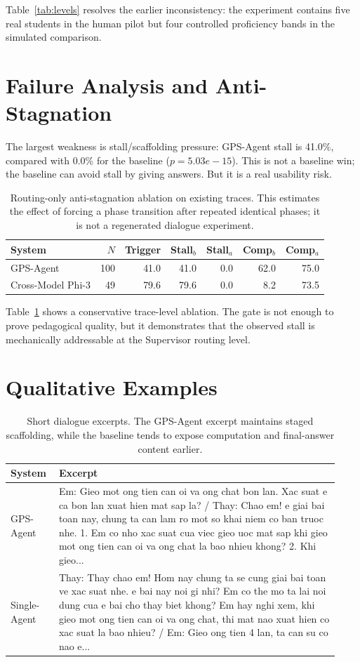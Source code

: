 \documentclass[11pt]{article}
\begin{document}
Table~\ref{tab:levels} resolves the earlier inconsistency: the experiment contains five real students in the human pilot but four controlled proficiency bands in the simulated comparison.

\section{Failure Analysis and Anti-Stagnation}
The largest weakness is stall/scaffolding pressure: GPS-Agent stall is 41.0\%, compared with 0.0\% for the baseline ($p=5.03e-15$). This is not a baseline win; the baseline can avoid stall by giving answers. But it is a real usability risk.

\begin{table}[t]
\centering
\small
\begin{tabular}{lrrrrrr}
\toprule
System & $N$ & Trigger & Stall$_b$ & Stall$_a$ & Comp$_b$ & Comp$_a$ \\
\midrule
GPS-Agent & 100 & 41.0 & 41.0 & 0.0 & 62.0 & 75.0 \\
Cross-Model Phi-3 & 49 & 79.6 & 79.6 & 0.0 & 8.2 & 73.5 \\
\bottomrule
\end{tabular}
\caption{Routing-only anti-stagnation ablation on existing traces. This estimates the effect of forcing a phase transition after repeated identical phases; it is not a regenerated dialogue experiment.}
\label{tab:ablation}
\end{table}

Table~\ref{tab:ablation} shows a conservative trace-level ablation. The gate is not enough to prove pedagogical quality, but it demonstrates that the observed stall is mechanically addressable at the Supervisor routing level.

\section{Qualitative Examples}
\begin{table}[t]
\centering
\small
\begin{tabular}{p{0.13\linewidth}p{0.80\linewidth}}
\toprule
System & Excerpt \\
\midrule
GPS-Agent & Em: Gieo mot ong tien can oi va ong chat bon lan. Xac suat e ca bon lan xuat hien mat sap la? / Thay: Chao em! e giai bai toan nay, chung ta can lam ro mot so khai niem co ban truoc nhe. 1. Em co nho xac suat cua viec gieo uoc mat sap khi gieo mot ong tien can oi va ong chat la bao nhieu khong? 2. Khi gieo... \\
Single-Agent & Thay: Thay chao em! Hom nay chung ta se cung giai bai toan ve xac suat nhe. e bai nay noi gi nhi? Em co the mo ta lai noi dung cua e bai cho thay biet khong? Em hay nghi xem, khi gieo mot ong tien can oi va ong chat, thi mat nao xuat hien co xac suat la bao nhieu? / Em: Gieo ong tien 4 lan, ta can su co nao e... \\
\bottomrule
\end{tabular}
\caption{Short dialogue excerpts. The GPS-Agent excerpt maintains staged scaffolding, while the baseline tends to expose computation and final-answer content earlier.}
\label{tab:qual}
\end{table}
\end{document}
